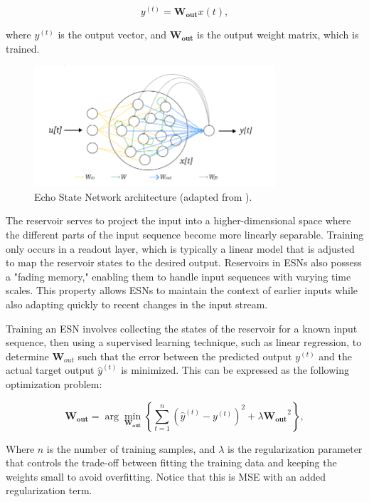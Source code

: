 \documentclass[11pt]{article}
\begin{document}
\begin{equation}
y^{(t)} = \mathbf{W_{out}}x{(t)},
\end{equation}

where $y^{(t)}$ is the output vector, and $\mathbf{W_{out}}$ is the output weight matrix, which is trained.

\begin{figure}[h] 
\centering 
\includegraphics[width=0.8\textwidth]{echo_diagram.png} 
\caption{Echo State Network architecture (adapted from \cite{reservoirpy}).}
\label{fig:esn}
\end{figure}

The reservoir serves to project the input into a higher-dimensional space where the different parts of the input sequence become more linearly separable. Training only occurs in a readout layer, which is typically a linear model that is adjusted to map the reservoir states to the desired output. Reservoirs in ESNs also possess a "fading memory," enabling them to handle input sequences with varying time scales. This property allows ESNs to maintain the context of earlier inputs while also adapting quickly to recent changes in the input stream.

Training an ESN involves collecting the states of the reservoir for a known input sequence, then using a supervised learning technique, such as linear regression, to determine $\mathbf{W}_{out}$ such that the error between the predicted output $y^{(t)}$ and the actual target output $\hat{y}^{(t)}$ is minimized. This can be expressed as the following optimization problem:

\begin{equation}
\mathbf{W_{out}} = \arg\min_{\mathbf{W_{out}}} \left\{\sum_{t=1}^{n} (\hat{y}^{(t)} - y^{(t)})^2 + \lambda \mathbf{W_{out}}^2\right\},
\end{equation}

Where $n$ is the number of training samples, and $\lambda$ is the regularization parameter that controls the trade-off between fitting the training data and keeping the weights small to avoid overfitting. Notice that this is MSE with an added regularization term.
\end{document}
